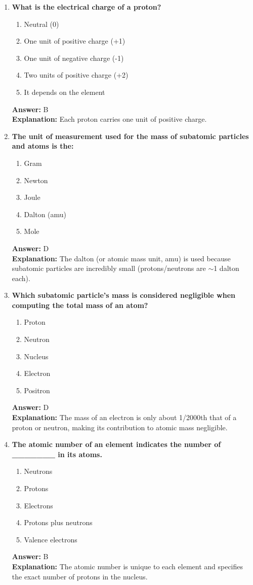 \documentclass[11pt, a4paper]{article}
\begin{document}
\begin{enumerate}
\item \textbf{What is the electrical charge of a proton?}
\begin{enumerate}[label=\Alph*.]
    \item Neutral (0)
    \item One unit of positive charge (+1)
    \item One unit of negative charge (-1)
    \item Two units of positive charge (+2)
    \item It depends on the element
\end{enumerate}
\textbf{Answer:} B \\
\textbf{Explanation:} Each proton carries one unit of positive charge.

\item \textbf{The unit of measurement used for the mass of subatomic particles and atoms is the:}
\begin{enumerate}[label=\Alph*.]
    \item Gram
    \item Newton
    \item Joule
    \item Dalton (amu)
    \item Mole
\end{enumerate}
\textbf{Answer:} D \\
\textbf{Explanation:} The dalton (or atomic mass unit, amu) is used because subatomic particles are incredibly small (protons/neutrons are $\sim$1 dalton each).

\item \textbf{Which subatomic particle's mass is considered negligible when computing the total mass of an atom?}
\begin{enumerate}[label=\Alph*.]
    \item Proton
    \item Neutron
    \item Nucleus
    \item Electron
    \item Positron
\end{enumerate}
\textbf{Answer:} D \\
\textbf{Explanation:} The mass of an electron is only about 1/2000th that of a proton or neutron, making its contribution to atomic mass negligible.

\item \textbf{The atomic number of an element indicates the number of \_\_\_\_\_\_\_ in its atoms.}
\begin{enumerate}[label=\Alph*.]
    \item Neutrons
    \item Protons
    \item Electrons
    \item Protons plus neutrons
    \item Valence electrons
\end{enumerate}
\textbf{Answer:} B \\
\textbf{Explanation:} The atomic number is unique to each element and specifies the exact number of protons in the nucleus.


\end{enumerate}
\end{document}
